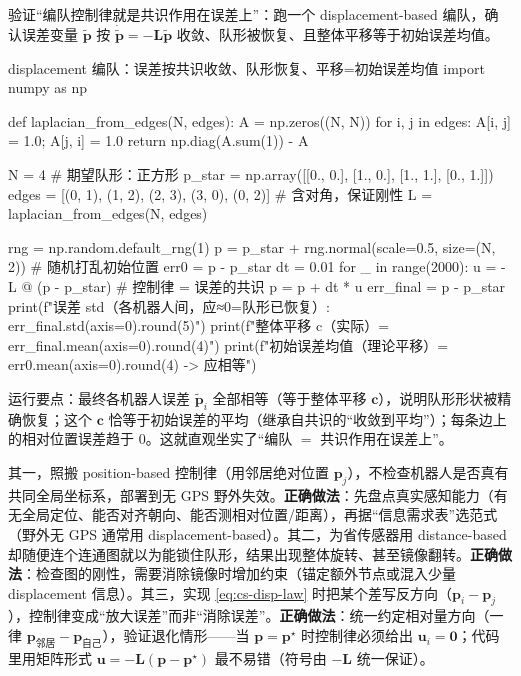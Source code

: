 验证“编队控制律就是共识作用在误差上”：跑一个 displacement-based 编队，确认误差变量 $\tilde{\mathbf{p}}$ 按 $\dot{\tilde{\mathbf{p}}}=-\mathbf{L}\tilde{\mathbf{p}}$ 收敛、队形被恢复、且整体平移等于初始误差均值。

\begin{codebox}[Python]{displacement 编队：误差按共识收敛、队形恢复、平移=初始误差均值}
import numpy as np

def laplacian_from_edges(N, edges):
    A = np.zeros((N, N))
    for i, j in edges:
        A[i, j] = 1.0; A[j, i] = 1.0
    return np.diag(A.sum(1)) - A

N = 4                                                # 期望队形：正方形
p_star = np.array([[0., 0.], [1., 0.], [1., 1.], [0., 1.]])
edges = [(0, 1), (1, 2), (2, 3), (3, 0), (0, 2)]     # 含对角，保证刚性
L = laplacian_from_edges(N, edges)

rng = np.random.default_rng(1)
p = p_star + rng.normal(scale=0.5, size=(N, 2))      # 随机打乱初始位置
err0 = p - p_star
dt = 0.01
for _ in range(2000):
    u = -L @ (p - p_star)                            # 控制律 = 误差的共识
    p = p + dt * u
err_final = p - p_star
print(f"误差 std（各机器人间，应≈0=队形已恢复）: {err_final.std(axis=0).round(5)}")
print(f"整体平移 c（实际）= {err_final.mean(axis=0).round(4)}")
print(f"初始误差均值（理论平移）= {err0.mean(axis=0).round(4)}  -> 应相等")
\end{codebox}

\noindent 运行要点：最终各机器人误差 $\tilde{\mathbf{p}}_i$ 全部相等（等于整体平移 $\mathbf{c}$），说明队形形状被精确恢复；这个 $\mathbf{c}$ 恰等于初始误差的平均（继承自共识的“收敛到平均”）；每条边上的相对位置误差趋于 0。这就直观坐实了“编队 $=$ 共识作用在误差上”。

\begin{pitfall}
其一，照搬 position-based 控制律（用邻居绝对位置 $\mathbf{p}_j$），不检查机器人是否真有共同全局坐标系，部署到无 GPS 野外失效。\textbf{正确做法}：先盘点真实感知能力（有无全局定位、能否对齐朝向、能否测相对位置/距离），再据“信息需求表”选范式（野外无 GPS 通常用 displacement-based）。其二，为省传感器用 distance-based 却随便连个连通图就以为能锁住队形，结果出现整体旋转、甚至镜像翻转。\textbf{正确做法}：检查图的刚性，需要消除镜像时增加约束（锚定额外节点或混入少量 displacement 信息）。其三，实现 \cref{eq:cs-disp-law} 时把某个差写反方向（$\mathbf{p}_i-\mathbf{p}_j$），控制律变成“放大误差”而非“消除误差”。\textbf{正确做法}：统一约定相对量方向（一律 $\mathbf{p}_{\text{邻居}}-\mathbf{p}_{\text{自己}}$），验证退化情形——当 $\mathbf{p}=\mathbf{p}^\star$ 时控制律必须给出 $\mathbf{u}_i=\mathbf{0}$；代码里用矩阵形式 $\mathbf{u}=-\mathbf{L}(\mathbf{p}-\mathbf{p}^\star)$ 最不易错（符号由 $-\mathbf{L}$ 统一保证）。
\end{pitfall}

